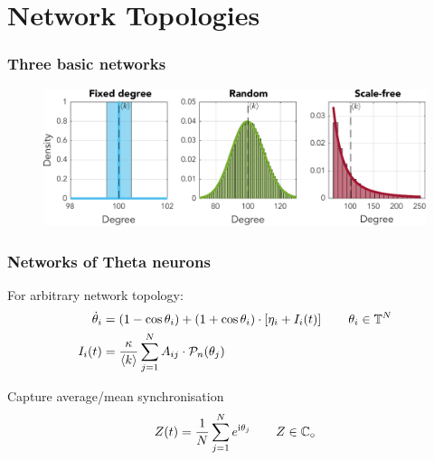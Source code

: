 \begin{frame}
\begin{figure}[H]
\endminipage
\label{fig:thetaneuronbifurcationtikz}
\end{figure}
\end{frame}




\section{\theory Network Topologies}
\begin{frame}
\frametitle{Three basic networks}
\begin{figure}[H]
\centering
\includegraphics[width = \textwidth]{../Figures/Distributions/1D.pdf}
\label{fig:1Dpdfs}
\end{figure}
\end{frame}

\begin{frame}
\frametitle{Networks of Theta neurons}
\tabitem For arbitrary network topology:
\begin{align*}
\dot{\theta}_{i} &=\left(1-\cos \theta_{i}\right)+\left(1+\cos \theta_{i}\right) \cdot \left[\eta_{i} + I_{i}(t)\right] \qquad \theta_i \in {\mathbb{T}}^N \\
I_{i}(t) &=\frac{\kappa}{{\langle k\rangle}} \sum_{j=1}^{N} A_{i j} \cdot \mathcal{P}_{n}(\theta_{j}) 
\end{align*}

\tabitem Capture average/mean synchronisation
\begin{align*}
Z(t) = \frac{1}{N} \sum_{j=1}^N e^{{\rm{i}}\theta_j}  \qquad Z \in \mathbb{C}_\circ 
\end{align*}
\end{frame}



